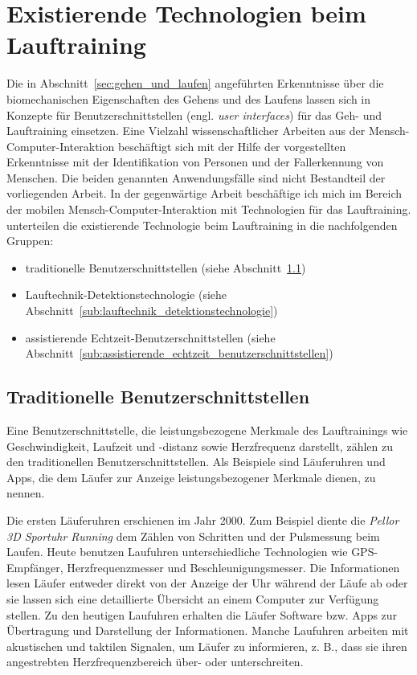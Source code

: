 \section{Existierende Technologien beim Lauftraining}
\label{sec:existierende-technologien-beim-lauftraining}

Die in Abschnitt~\ref{sec:gehen_und_laufen} angeführten Erkenntnisse über die biomechanischen Eigenschaften des Gehens und des Laufens lassen sich in Konzepte für Benutzerschnittstellen (engl. \emph{user interfaces}) für das Geh- und Lauftraining einsetzen. Eine Vielzahl wissenschaftlicher Arbeiten aus der Mensch-Computer-Interaktion beschäftigt sich mit der Hilfe der vorgestellten Erkenntnisse mit der Identifikation von Personen und der Fallerkennung von Menschen. Die beiden genannten Anwendungsfälle sind nicht Bestandteil der vorliegenden Arbeit. In der gegenwärtige Arbeit beschäftige ich mich im Bereich der mobilen Mensch-Computer-Interaktion mit Technologien für das Lauftraining. \pagebreak \citet{Jensen2014} unterteilen die existierende Technologie beim Lauftraining in die nachfolgenden Gruppen:

\begin{itemize}
\item traditionelle Benutzerschnittstellen (siehe Abschnitt~\ref{sub:traditionelle-benutzerschnittstellen})
\item Lauftechnik-Detektionstechnologie (siehe Abschnitt~\ref{sub:lauftechnik_detektionstechnologie})
\item assistierende Echtzeit-Benutzerschnittstellen (siehe Abschnitt~\ref{sub:assistierende_echtzeit_benutzerschnittstellen})
\end{itemize}

\subsection{Traditionelle Benutzerschnittstellen}
\label{sub:traditionelle-benutzerschnittstellen}

Eine Benutzerschnittstelle, die leistungsbezogene Merkmale des Lauftrainings wie Geschwindigkeit, Laufzeit und -distanz sowie Herzfrequenz darstellt, zählen \citet{Jensen2014} zu den traditionellen Benutzerschnittstellen. Als Beispiele sind Läuferuhren und Apps, die dem Läufer zur Anzeige leistungsbezogener Merkmale dienen, zu nennen.

Die ersten Läuferuhren erschienen im Jahr 2000. Zum Beispiel diente die \emph{Pellor 3D Sportuhr Running} dem Zählen von Schritten und der Pulsmessung beim Laufen. Heute benutzen Laufuhren unterschiedliche Technologien wie \ac{GPS}-Empfänger, Herzfrequenzmesser und Beschleunigungsmesser. Die Informationen lesen Läufer entweder direkt von der Anzeige der Uhr während der Läufe ab oder sie lassen sich eine detaillierte Übersicht an einem Computer zur Verfügung stellen. Zu den heutigen Laufuhren erhalten die Läufer Software bzw. Apps zur Übertragung und Darstellung der Informationen. Manche Laufuhren arbeiten mit akustischen und taktilen Signalen, um Läufer zu informieren, z. B., dass sie ihren angestrebten Herzfrequenzbereich über- oder unterschreiten.

